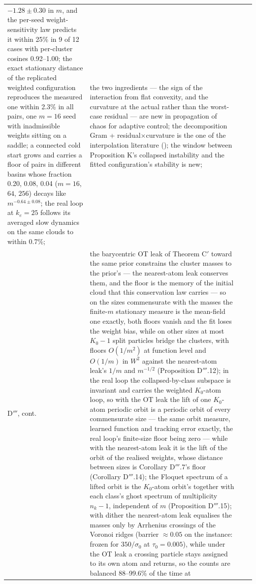 {\begin{longtable}{@{}>{\raggedright\arraybackslash}p{}>{\raggedright\arraybackslash}p{}%
>{\raggedright\arraybackslash}p{}>{\raggedright\arraybackslash}p{}@{}}
$-1.28\pm0.30$ in $m$, and the per-seed weight-sensitivity law predicts it within 25\% in 9 of 12 cases with
per-cluster cosines 0.92--1.00; the exact stationary distance of the replicated weighted configuration reproduces the
measured one within 2.3\% in all pairs, one $m = 16$ seed with inadmissible weights sitting on a saddle; a connected
cold start grows and carries a floor of pairs in different basins whose fraction 0.20, 0.08, 0.04 ($m = 16$, $64$,
$256$) decays like $m^{-0.64\pm0.08}$; the real loop at $k_e = 25$ follows its averaged slow dynamics on the same
clouds to within 0.7\%;
& the two ingredients --- the sign of the interaction from flat convexity, and the curvature at the actual rather
than the worst-case residual --- are new in propagation of chaos for adaptive control; the decomposition
Gram + residual$\times$curvature is the one of the interpolation literature (\cite{S39}); the window between
Proposition K's collapsed instability and the fitted configuration's stability is new;\\
D$'''$, cont. & the barycentric OT leak of Theorem C$'$ toward
the same prior constrains the cluster masses to the prior's --- the nearest-atom leak conserves them, and the floor
is the memory of the initial cloud that this conservation law carries --- so on the sizes commensurate with the
masses the finite-$m$ stationary measure is the mean-field one exactly, both floors vanish and the fit loses the
weight bias, while on other sizes at most $K_0 - 1$ split particles bridge the clusters, with floors $O(1/m^2)$ at
function level and $O(1/m)$ in $W^2$ against the nearest-atom leak's $1/m$ and $m^{-1/2}$ (Proposition D$'''$.12);
in the real loop the collapsed-by-class subspace is invariant and carries the weighted $K_0$-atom loop, so with the
OT leak the lift of one $K_0$-atom periodic orbit is a periodic orbit of every commensurate size --- the same orbit
measure, learned function and tracking error exactly, the real loop's finite-size floor being zero --- while with
the nearest-atom leak it is the lift of the orbit of the realised weights, whose distance between sizes is
Corollary D$'''$.7's floor (Corollary D$'''$.14); the Floquet spectrum of a lifted orbit is the $K_0$-atom orbit's
together with each class's ghost spectrum of multiplicity $n_k - 1$, independent of $m$ (Proposition D$'''$.15);
with dither the nearest-atom leak equalises the masses only by Arrhenius crossings of the Voronoi ridges
(barrier $\approx0.05$ on the instance: frozen for $350/\sigma_0$ at $\tau_0 = 0.005$), while under the OT leak a
crossing particle stays assigned to its own atom and returns, so the counts are balanced 88--99.6\% of the time at

\end{longtable}}
